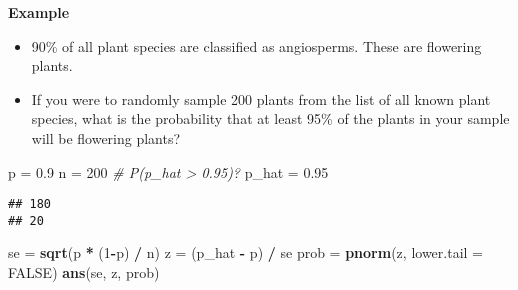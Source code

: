 \documentclass[]{book}
\newenvironment{Shaded}{\begin{snugshade}}{\end{snugshade}}
\newcommand{\CommentTok}[1]{\textcolor[rgb]{0.56,0.35,0.01}{\textit{#1}}}
\newcommand{\DataTypeTok}[1]{\textcolor[rgb]{0.13,0.29,0.53}{#1}}
\newcommand{\DecValTok}[1]{\textcolor[rgb]{0.00,0.00,0.81}{#1}}
\newcommand{\FloatTok}[1]{\textcolor[rgb]{0.00,0.00,0.81}{#1}}
\newcommand{\KeywordTok}[1]{\textcolor[rgb]{0.13,0.29,0.53}{\textbf{#1}}}
\newcommand{\NormalTok}[1]{#1}
\newcommand{\OperatorTok}[1]{\textcolor[rgb]{0.81,0.36,0.00}{\textbf{#1}}}
\newcommand{\OtherTok}[1]{\textcolor[rgb]{0.56,0.35,0.01}{#1}}
\newcommand{\StringTok}[1]{\textcolor[rgb]{0.31,0.60,0.02}{#1}}
\providecommand{\tightlist}{%
  \setlength{\itemsep}{0pt}\setlength{\parskip}{0pt}}
\begin{document}
\textbf{Example}

\begin{itemize}
\tightlist
\item
  90\% of all plant species are classified as angiosperms. These are flowering plants.
\item
  If you were to randomly sample 200 plants from the list of all known plant species, what is the probability that at least 95\% of the plants in your sample will be flowering plants?
\end{itemize}

\begin{Shaded}
\begin{Highlighting}[]
\NormalTok{p =}\StringTok{ }\FloatTok{0.9}
\NormalTok{n =}\StringTok{ }\DecValTok{200}
\CommentTok{# P(p_hat > 0.95)?}
\NormalTok{p_hat =}\StringTok{ }\FloatTok{0.95}
\end{Highlighting}
\end{Shaded}

\begin{Shaded}
\end{Shaded}

\begin{verbatim}
## 180
## 20
\end{verbatim}

\begin{Shaded}
\begin{Highlighting}[]
\NormalTok{se =}\StringTok{ }\KeywordTok{sqrt}\NormalTok{(p }\OperatorTok{*}\StringTok{ }\NormalTok{(}\DecValTok{1}\OperatorTok{-}\NormalTok{p) }\OperatorTok{/}\StringTok{ }\NormalTok{n)}
\NormalTok{z =}\StringTok{ }\NormalTok{(p_hat }\OperatorTok{-}\StringTok{ }\NormalTok{p) }\OperatorTok{/}\StringTok{ }\NormalTok{se}
\NormalTok{prob =}\StringTok{ }\KeywordTok{pnorm}\NormalTok{(z, }\DataTypeTok{lower.tail =} \OtherTok{FALSE}\NormalTok{)}
\KeywordTok{ans}\NormalTok{(se, z, prob)}
\end{Highlighting}
\end{Shaded}
\end{document}
